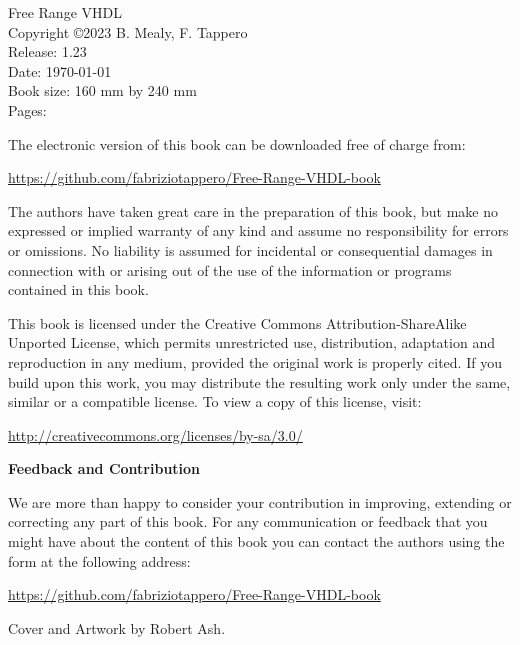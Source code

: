 %
%

{\footnotesize
\noindent
Free Range VHDL\\
Copyright \copyright 2023 B. Mealy, F. Tappero\\
Release: 1.23 \\
Date: \today\\
Book size: 160 mm by 240 mm\\
Pages: \\
\vspace{20pt}

\noindent
The electronic version of this book can be downloaded free of charge from:

\noindent
\url{https://github.com/fabriziotappero/Free-Range-VHDL-book}

\vspace{15pt}

\noindent
The authors have taken great care in the preparation of this book, but make no expressed or implied warranty of any kind and assume no responsibility for errors or omissions. No liability is assumed for incidental or consequential damages in connection with or arising out of the use of the information or programs contained in this book.

\vspace{15pt}

\noindent
This book is licensed under the Creative Commons Attribution-ShareAlike Unported License, which permits unrestricted use, distribution, adaptation and reproduction in any medium, provided the original work is properly cited. If you build upon this work, you may distribute the resulting work only under the same, similar or a compatible license. To view a copy of this license, visit:

\noindent
\url{http://creativecommons.org/licenses/by-sa/3.0/}
\vspace{25pt}

\noindent
{\sffamily\bfseries Feedback and Contribution}

\noindent
We are more than happy to consider your contribution in improving, extending or correcting any part of this book.
For any communication or feedback that you might have about the content of this book you can contact the authors using the form at the following address:

\noindent
\url{https://github.com/fabriziotappero/Free-Range-VHDL-book}

\vfill
\noindent
Cover and Artwork by Robert Ash.

} %
